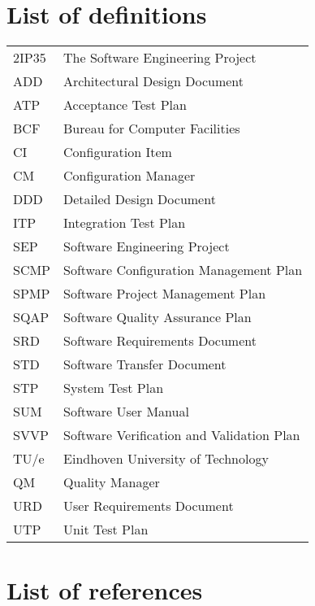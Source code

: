 \section{List of definitions}
\begin{tabular}{@{}ll@{}}
	\toprule
	2IP35 & The Software Engineering Project \\
	ADD   & Architectural Design Document \\
	ATP   & Acceptance Test Plan \\
	BCF   & Bureau for Computer Facilities \\
	CI    & Configuration Item \\
	CM    & Configuration Manager \\
	DDD   & Detailed Design Document \\
	ITP   & Integration Test Plan \\
	SEP   & Software Engineering Project \\
	SCMP  & Software Configuration Management Plan \\
	SPMP  & Software Project Management Plan \\
	SQAP  & Software Quality Assurance Plan \\
	SRD   & Software Requirements Document \\
	STD   & Software Transfer Document \\
	STP   & System Test Plan \\
	SUM   & Software User Manual \\
	SVVP  & Software Verification and Validation Plan \\
	TU/e  & Eindhoven University of Technology \\
	QM    & Quality Manager \\
	URD   & User Requirements Document \\
	UTP   & Unit Test Plan \\
	\bottomrule
\end{tabular}

\section{List of references}
